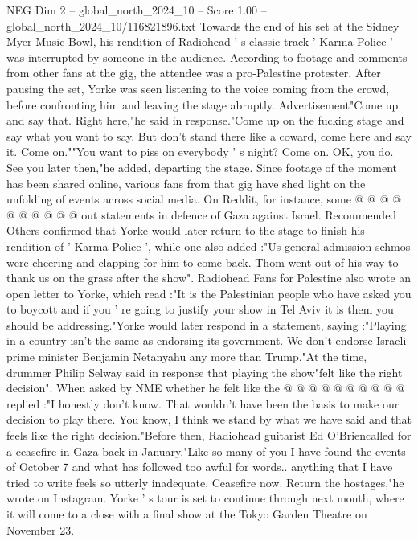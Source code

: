 \begin{textsample}{NEG Dim 2 – global\_north\_2024\_10 – Score 1.00 – global\_north\_2024\_10/116821896.txt}  \label{ex:f2_neg_107}
Towards the end of his set at the Sidney Myer Music Bowl, his rendition of Radiohead ' s classic track ' Karma Police ' was interrupted by someone in the audience.
According to footage and comments from other fans at the gig, the attendee was a pro-Palestine protester.
After pausing the set, Yorke was seen listening to the voice coming from the crowd, before confronting him and leaving the stage abruptly.
Advertisement"Come up and say that.
Right here,"he said in response."Come up on the fucking stage and say what you want to say.
But don't stand there like a coward, come here and say it.
Come on.""You want to piss on everybody ' s night?
Come on.
OK, you do.
See you later then,"he added, departing the stage.
Since footage of the moment has been shared online, various fans from that gig have shed light on the unfolding of events across social media.
On Reddit, for instance, some @ @ @ @ @ @ @ @ @ @ out statements in defence of Gaza against Israel.
Recommended Others confirmed that Yorke would later return to the stage to finish his rendition of ' Karma Police ', while one also added :"Us general admission schmos were cheering and clapping for him to come back.
Thom went out of his way to thank us on the grass after the show".
Radiohead Fans for Palestine also wrote an open letter to Yorke, which read :"It is the Palestinian people who have asked you to boycott and if you ' re going to justify your show in Tel Aviv it is them you should be addressing."Yorke would later respond in a statement, saying :"Playing in a country isn't the same as endorsing its government.
We don't endorse Israeli prime minister Benjamin Netanyahu any more than Trump."At the time, drummer Philip Selway said in response that playing the show"felt like the right decision".
When asked by NME whether he felt like the @ @ @ @ @ @ @ @ @ @ replied :"I honestly don't know.
That wouldn't have been the basis to make our decision to play there.
You know, I think we stand by what we have said and that feels like the right decision."Before then, Radiohead guitarist Ed O'Briencalled for a ceasefire in Gaza back in January."Like so many of you I have found the events of October 7 and what has followed too awful for words.. anything that I have tried to write feels so utterly inadequate.
Ceasefire now.
Return the hostages,"he wrote on Instagram.
Yorke ' s tour is set to continue through next month, where it will come to a close with a final show at the Tokyo Garden Theatre on November 23.

\end{textsample}
